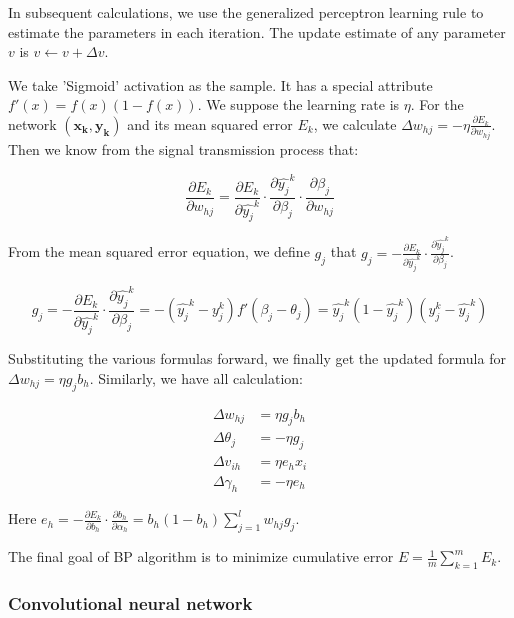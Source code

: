 In subsequent calculations, we use the generalized perceptron learning rule to estimate the parameters in each iteration. The update estimate of any parameter $v$ is $v \leftarrow v + \Delta v$. 

We take 'Sigmoid' activation as the sample. It has a special attribute $f'(x) = f(x)(1-f(x))$. We suppose the learning rate is $\eta$. For the network $(\bm{x_k,\bm{y}_k})$ and its mean squared error $E_k$, we calculate $\Delta w_{hj} = -\eta\frac{\partial E_k}{\partial w_{hj}}$. Then we know from the signal transmission process that:

\begin{equation}
    \frac{\partial E_k}{\partial w_{hj}} = \frac{\partial E_k}{\partial\hat{y_j}^k}\cdot\frac{\partial\hat{y_j}^k}{\partial\beta_j}\cdot\frac{\partial\beta_j}{\partial w_{hj}}
\end{equation}

From the mean squared error equation, we define $g_j$ that $g_j = -\frac{\partial E_k}{\partial\hat{y_j}^k}\cdot\frac{\partial\hat{y_j}^k}{\partial\beta_j}$. 

\begin{equation*}
    g_j = -\frac{\partial E_k}{\partial\hat{y_j}^k}\cdot\frac{\partial\hat{y_j}^k}{\partial\beta_j} = -(\hat{y_j}^k - y_j^k)f'(\beta_j - \theta_j) = \hat{y_j}^k(1-\hat{y_j}^k)(y_j^k - \hat{y_j}^k)
\end{equation*}

Substituting the various formulas forward, we finally get the updated formula for $\Delta w_{hj} = \eta g_j b_h$. Similarly, we have all calculation:

\begin{align*}
\Delta w_{hj} &= \eta g_j b_h \\
\Delta\theta_j &= -\eta g_j \\
\Delta v_{ih} &= \eta e_h x_i\\
\Delta\gamma_h &=-\eta e_h
\end{align*}

Here $e_h = -\frac{\partial E_k}{\partial b_h}\cdot\frac{\partial b_h}{\partial\alpha_h} = b_h(1-b_h)\sum_{j = 1}^l w_{hj}g_j$.

The final goal of BP algorithm is to minimize cumulative error $E = \frac{1}{m}\sum_{k = 1}^m E_k$.

\subsubsection{Convolutional neural network}

